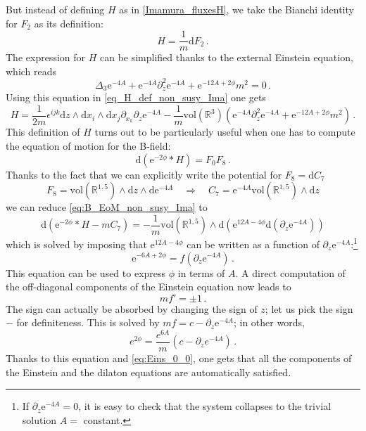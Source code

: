 \documentclass[12pt]{article}
\newcommand{\R}{\mathbb{R}}
\newcommand{\dd}{\mathrm{d}}
\newcommand{\e}{\mathrm{e}}
\newcommand{\vol}{\mathrm{vol}}
\begin{document}
But instead of defining $H$ as in \eqref{Imamura_fluxesH}, we take the Bianchi identity for $F_2$ as its definition:
\begin{equation}
\label{eq_H_def_non_susy_Ima}
H = \frac{1}{m}\dd F_2 \, .
\end{equation}
The expression for $H$ can be simplified thanks to the external Einstein equation, which reads
\begin{equation}
\label{eq:Eins_0_0}
\Delta_3 \e^{-4A} +  \e^{-4A} \partial_z^2 \e^{-4A} + \e^{-12A+2 \phi}m^2 = 0 \, .  
\end{equation}
Using this equation in \eqref{eq_H_def_non_susy_Ima} one gets
\begin{equation}
H= \frac{1}{2m} \epsilon^{ijk} \dd z \wedge \dd x_i \wedge \dd x_j \partial_{x_k} \partial_z \e^{-4A} - \frac{1}{m} \vol(\R^3) ( \e^{-4A} \partial_z^2 \e^{-4A} + \e^{-12A+2 \phi}m^2) \, . 
\end{equation}
This definition of $H$ turns out to be particularly useful when one has to compute the equation of motion for the B-field:
\begin{equation}
\label{eq:B_EoM_non_susy_Ima}
\dd (\e^{-2 \phi} * H) = F_0 F_8 \, .
\end{equation}
Thanks to the fact that we can explicitly write the potential for $F_8 = \dd C_7$
\begin{equation}
\label{eq:F_8_def}
F_8 = \vol(\R^{1,5}) \wedge \dd z \wedge \dd \e^{-4A} \quad \Rightarrow \quad C_7 = \e^{-4A} \vol(\R^{1,5}) \wedge \dd z
\end{equation}
we can reduce \eqref{eq:B_EoM_non_susy_Ima} to
\begin{equation}
\dd (\e^{-2 \phi} * H - m C_7) = -\frac{1}{m} \vol(\R^{1,5}) \wedge \dd \left( \e^{12A - 4 \phi} \dd  ( \partial_z \e^{-4A}) \right)
\end{equation}
which is solved by imposing that $\e^{12A - 4 \phi}$ can be written as a function of $\partial_z \e^{-4A}$:\footnote{If $ \partial_z \e^{-4A}=0$, it is easy to check that the system collapses to the trivial solution $A=$ constant.}
\begin{equation}
\e^{-6A + 2 \phi} = f(\partial_z \e^{-4A}) \, .
\end{equation}
This equation can be used to express $\phi$ in terms of $A$. A direct computation of the off-diagonal components of the Einstein equation now leads to
\begin{equation}
m f ' = \pm 1\,.
\end{equation}
The sign can actually be absorbed by changing the sign of $z$; let us pick the sign $-$ for definiteness. This is solved by $mf = c - \partial_z \e^{-4A}$; in other words,
\begin{equation}
\label{Imamura_Phi_nonsusy}
e^{2\phi} = \frac{e^{6 A}}{m} \left(c-\partial_{z}e^{-4 A} \right) \, .
\end{equation}
Thanks to this equation and \eqref{eq:Eins_0_0}, one gets that all the components of the Einstein and the dilaton equations are automatically satisfied. 
\end{document}
